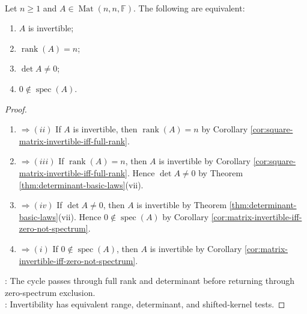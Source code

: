 \begin{corollary} \label{cor:matrix-nonsingularity-rank-determinant-spectrum-dictionary} \\
Let $n\geq1$ and $A\in\operatorname{Mat}(n,n,\mathbb{F})$. The following are equivalent:
\begin{enumerate}[label=(\roman*)]
\setlength{\itemsep}{0pt}
\item $A$ is invertible;
\item $\operatorname{rank}(A)=n$;
\item $\det A\neq0$;
\item $0\notin\operatorname{spec}(A)$.
\end{enumerate}
\begin{proof}
\begin{enumerate}[label=(\roman*)]
\setlength{\itemsep}{0pt}
\item[$(i)$]$\Rightarrow (ii)$ If $A$ is invertible, then $\operatorname{rank}(A)=n$ by Corollary \ref{cor:square-matrix-invertible-iff-full-rank}. \item[$(ii)$]$\Rightarrow (iii)$ If $\operatorname{rank}(A)=n$, then $A$ is invertible by Corollary \ref{cor:square-matrix-invertible-iff-full-rank}. Hence $\det A\neq0$ by Theorem \ref{thm:determinant-basic-laws}(vii). \item[$(iii)$]$\Rightarrow (iv)$ If $\det A\neq0$, then $A$ is invertible by Theorem \ref{thm:determinant-basic-laws}(vii). Hence $0\notin\operatorname{spec}(A)$ by Corollary \ref{cor:matrix-invertible-iff-zero-not-spectrum}. \item[$(iv)$]$\Rightarrow (i)$ If $0\notin\operatorname{spec}(A)$, then $A$ is invertible by Corollary \ref{cor:matrix-invertible-iff-zero-not-spectrum}.
\end{enumerate}
: The cycle passes through full rank and determinant before returning through zero-spectrum exclusion.\\
: Invertibility has equivalent range, determinant, and shifted-kernel tests.
\end{proof}
\end{corollary}

